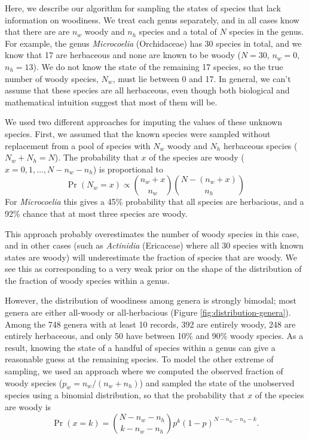 \documentclass[12pt]{article}
\begin{document}
Here, we describe our algorithm for sampling the states of species
that lack information on woodiness.  We treat each genus separately,
and in all cases know that there are are $n_w$ woody and $n_h$ species
and a total of $N$ species in the genus.
%
For example, the genus \textit{Microcoelia} (Orchidaceae) has 30
species in total, and we know that 17 are herbaceous and none are
known to be woody ($N = 30$, $n_w = 0$, $n_h = 13$).  We do not know
the state of the remaining 17 species, so the true number of woody
species, $N_w$, must lie between 0 and 17.  In general, we can't
assume that these species are all herbaceous, even though both
biological and mathematical intuition suggest that most of them will
be.

We used two different approaches for imputing the values of these
unknown species.  First, we assumed that the known species were
sampled without replacement from a pool of species with $N_w$ woody
and $N_h$ herbaceous species ($N_w + N_h = N$).  The probability that
$x$ of the species are woody ($x = 0, 1, \ldots, N - n_w - n_h$) is
proportional to
\begin{equation}
  \Pr(N_w = x) \propto {n_w + x \choose n_w}
  {N - (n_w + x) \choose n_h}
\end{equation}
For \textit{Microcoelia} this gives a 45\% probability that all
species are herbacious, and a 92\% chance that at most three species
are woody.

This approach probably overestimates the number of woody species in
this case, and in other cases (such as \textit{Actinidia} (Ericaceae)
where all 30 species with known states are woody) will underestimate
the fraction of species that are woody.  We see this as corresponding
to a very weak prior on the shape of the distribution of the fraction
of woody species within a genus.

However, the distribution of woodiness among genera is strongly
bimodal; most genera are either all-woody or all-herbacious (Figure
\ref{fig:distribution-genera}).  Among the 748 genera with at least 10
records, 392 are entirely woody, 248 are entirely herbaceous, and only
50 have between 10\% and 90\% woody species.  As a result, knowing the
state of a handful of species within a genus can give a reasonable
guess at the remaining species.
To model the other extreme of sampling, we used an approach where we
computed the observed fraction of woody species ($p_w = n_w / (n_w +
n_h)$) and sampled the state of the unobserved species using a
binomial distribution, so that the probability that $x$ of the species
are woody is
\begin{equation}
  \Pr(x = k) = {N - n_w - n_h \choose k - n_w - n_h} 
  p^k (1-p)^{N - n_w - n_h - k}.
\end{equation}
\end{document}
